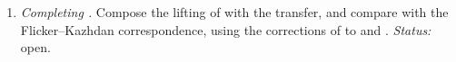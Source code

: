 \begin{enumerate}[label=(\roman*),start=2]
\item \emph{Completing \cite[Remark~10.3]{JC26a}.} Compose the lifting of \cite{JC26a} with the transfer, and compare with the Flicker--Kazhdan correspondence, using the corrections of \cite{Zo23} to \cite[\S26.2]{FK86} and \cite[Lemma~27.1]{FK86}. \emph{Status:} open.
\end{enumerate}
\endgroup
